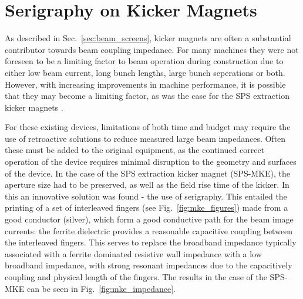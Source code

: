 \section{Serigraphy on Kicker Magnets}
\label{sec:seriagraphy}

As described in Sec.~\ref{sec:beam_screens}, kicker magnets are often a substantial contributor towards beam coupling impedance. For many machines they were not foreseen to be a limiting factor to beam operation during construction due to either low beam current, long bunch lengths, large bunch seperations or both. However, with increasing improvements in machine performance, it is possible that they may become a limiting factor, as was the case for the SPS extraction kicker magnets \cite{Kroyer:MKEReduct}. 

For these existing devices, limitations of both time and budget may require the use of retroactive solutions to reduce measured large beam impedances. Often these must be added to the original equipment, as the continued correct operation of the device requires minimal disruption to the geometry and surfaces of the device. In the case of the SPS extraction kicker magnet (SPS-MKE), the aperture size had to be preserved, as well as the field rise time of the kicker. In this an innovative solution was found - the use of serigraphy. This entailed the printing of a set of interleaved fingers (see Fig.~\ref{fig:mke_figures}) made from a good conductor (silver), which form a good conductive path for the beam image currents: the ferrite dielectric provides a reasonable capacitive coupling between the interleaved fingers. This serves to replace the broadband impedance typically associated with a ferrite dominated resistive wall impedance with a low broadband impedance, with strong resonant impedances due to the capacitively coupling and physical length of the fingers. The results in the case of the SPS-MKE can be seen in Fig.~\ref{fig:mke_impedance}.


